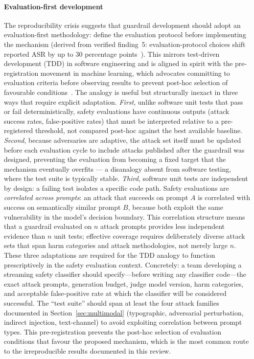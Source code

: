 \paragraph{Evaluation-first development}
The reproducibility crisis suggests that guardrail development should adopt an
evaluation-first methodology: define the evaluation protocol before implementing
the mechanism (derived from verified finding~5: evaluation-protocol choices shift reported ASR by up to 30 percentage points~\cite{li2024salad}).
This mirrors test-driven development (TDD) in software engineering and is
aligned in spirit with the pre-registration movement in machine learning, which
advocates committing to evaluation criteria before observing results to prevent
post-hoc selection of favourable conditions~\cite{pineau2021improving}.
The analogy is useful but structurally inexact in three ways that require explicit
adaptation.
\emph{First}, unlike software unit tests that pass or fail deterministically,
safety evaluations have continuous outputs (attack success rates, false-positive
rates) that must be interpreted relative to a pre-registered threshold, not
compared post-hoc against the best available baseline.
\emph{Second}, because adversaries are adaptive, the attack set itself must be
updated before each evaluation cycle to include attacks published after the
guardrail was designed, preventing the evaluation from becoming a fixed target
that the mechanism eventually overfits --- a disanalogy absent from software
testing, where the test suite is typically stable.
\emph{Third}, software unit tests are independent by design: a failing test
isolates a specific code path.
Safety evaluations are \emph{correlated across prompts}: an attack that succeeds
on prompt $A$ is correlated with success on semantically similar prompt $B$,
because both exploit the same vulnerability in the model's decision boundary.
This correlation structure means that a guardrail evaluated on $n$ attack prompts
provides less independent evidence than $n$ unit tests; effective coverage requires
deliberately diverse attack sets that span harm categories and attack methodologies,
not merely large $n$.
These three adaptations are required for the TDD analogy to function prescriptively
in the safety evaluation context.
Concretely: a team developing a streaming safety classifier should specify---before
writing any classifier code---the exact attack prompts, generation budget,
judge model version, harm categories, and acceptable false-positive rate at which
the classifier will be considered successful.
The ``test suite'' should span at least the four attack families documented in
Section~\ref{sec:multimodal} (typographic, adversarial perturbation, indirect
injection, text-channel) to avoid exploiting correlation between prompt types.
This pre-registration prevents the post-hoc selection of evaluation conditions
that favour the proposed mechanism, which is the most common route to the
irreproducible results documented in this review.

